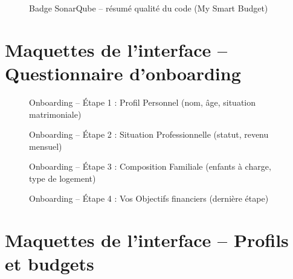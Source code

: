 \begin{figure}[H]
    \centering
    \caption{Badge SonarQube -- résumé qualité du code (My Smart Budget)}
    \label{fig:sonarqube-badge-ann}
\end{figure}

\section{Maquettes de l'interface -- Questionnaire d'onboarding}

\begin{figure}[H]
    \centering
    \caption{Onboarding -- Étape 1 : Profil Personnel (nom, âge, situation matrimoniale)}
    \label{fig:maquette-onboarding-1-ann}
\end{figure}

\begin{figure}[H]
    \centering
    \caption{Onboarding -- Étape 2 : Situation Professionnelle (statut, revenu mensuel)}
    \label{fig:maquette-onboarding-2-ann}
\end{figure}

\begin{figure}[H]
    \centering
    \caption{Onboarding -- Étape 3 : Composition Familiale (enfants à charge, type de logement)}
    \label{fig:maquette-onboarding-3-ann}
\end{figure}

\begin{figure}[H]
    \centering
    \caption{Onboarding -- Étape 4 : Vos Objectifs financiers (dernière étape)}
    \label{fig:maquette-onboarding-4-ann}
\end{figure}

\section{Maquettes de l'interface -- Profils et budgets}

